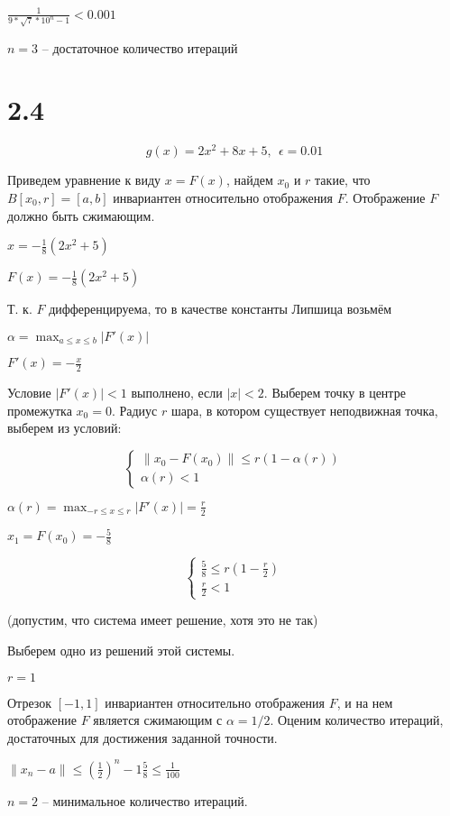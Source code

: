 \documentclass[a4paper]{article}
\begin{document}
$\frac{1}{9*\sqrt{7} * 10^n-1} < 0.001$

$n = 3$ -- достаточное количество итераций

\newpage

\section*{2.4}

\[ g(x) = 2x^2 + 8x + 5,  \ \ \epsilon = 0.01\]

Приведем уравнение к виду $x = F(x)$, найдем  $x_0$ и $r$ такие, что $B[x_0, r] = [a,b]$
инвариантен относительно отображения $F$. Отображение $F$ должно быть сжимающим.

$x = -\frac{1}{8}(2x^2 + 5)$

$F(x) = -\frac{1}{8}(2x^2 + 5)$

Т. к. $F$ дифференцируема, то в качестве константы Липшица возьмём 

$\alpha = \max_{a\le x \le b} |F'(x)|$

$F'(x) = -\frac{x}{2}$

Условие $|F'(x)| < 1$ выполнено, если $|x| < 2$. Выберем точку в центре промежутка $x_0 = 0$. Радиус $r$ шара, в
котором существует неподвижная точка, выберем из условий:

\[
\begin{cases}
  \|x_0 - F(x_0)\| \le r(1-\alpha (r)) \\
  \alpha(r)  < 1
\end{cases}
\]

$\alpha(r) = \max_{-r \le x \le r} |F'(x)| = \frac{r}{2}$

$x_1 = F(x_0) = -\frac{5}{8}$

\[
\begin{cases}
\frac{5}{8} \le r(1 - \frac{r}{2})\\
\frac{r}{2} < 1
\end{cases}
\]

(допустим, что система имеет решение, хотя это не так)

Выберем одно из решений этой системы.

$r = 1$

Отрезок $[-1, 1]$ инвариантен относительно отображения $F$, и на нем отображение $F$ 
является сжимающим с $\alpha = 1/2$. Оценим количество итераций, достаточных для
достижения заданной точности.

$\| x_n - a \| \le \left( \frac{1}{2} \right)^n-1 \frac{5}{8} \le \frac{1}{100}$

$n = 2$ -- минимальное количество итераций.
\end{document}
